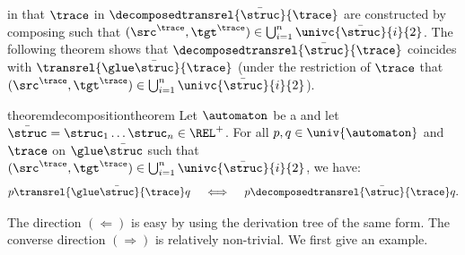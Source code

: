 \documentclass[a4paper,UKenglish,cleveref, autoref, thm-restate]{lipics-v2021}
\DeclarePairedDelimiter\tuple{(}{)}
\newcommand{\mul}[1]{\bar{#1}}
\begin{document}
in that  $\trace$ in $\decomposedtransrel{\mul{\struc}}{\trace}$ are
constructed by composing  such that $\tuple{\src^{\trace}, \tgt^{\trace}} \in \bigcup_{i = 1}^n \univc{\mul{\struc}}{i}{2}$.
The following theorem shows that $\decomposedtransrel{\mul{\struc}}{\trace}$ coincides with $\transrel{\glue \mul{\struc}}{\trace}$
(under the restriction of  $\trace$ that $\tuple{\src^{\trace}, \tgt^{\trace}} \in \bigcup_{i = 1}^n \univc{\mul{\struc}}{i}{2}$).
\begin{restatable}{theorem}{decompositiontheorem}\label{theorem: decomposition}
    Let $\automaton$ be a  and let $\mul{\struc} = \struc_1 \dots \struc_n \in \REL^{+}$.
    For all $p, q \in \univ{\automaton}$ and  $\trace$ on $\glue\mul{\struc}$ such that $\tuple{\src^{\trace}, \tgt^{\trace}} \in \bigcup_{i = 1}^n \univc{\mul{\struc}}{i}{2}$,
    we have:
    \[p \transrel{\glue \mul{\struc}}{\trace} q \quad\iff\quad p \decomposedtransrel{\mul{\struc}}{\trace} q.\]
\end{restatable}
The direction $(\Longleftarrow)$ is easy by using the derivation tree of the same form.
The converse direction $(\Longrightarrow)$ is relatively non-trivial.
We first give an example.
\end{document}
